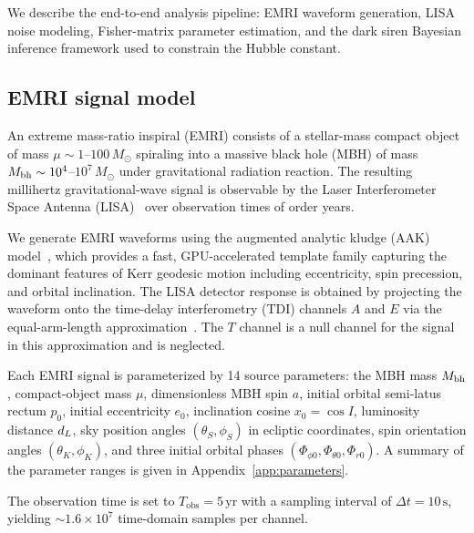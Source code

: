 
We describe the end-to-end analysis pipeline: EMRI waveform generation,
LISA noise modeling, Fisher-matrix parameter estimation, and the dark siren
Bayesian inference framework used to constrain the Hubble constant.

\subsection{EMRI signal model}
\label{sec:emri_signal}

An extreme mass-ratio inspiral (EMRI) consists of a stellar-mass compact
object of mass $\mu \sim 1$--$100\,M_\odot$ spiraling into a massive black
hole (MBH) of mass $M_\mathrm{bh} \sim 10^4$--$10^7\,M_\odot$ under gravitational
radiation reaction.  The resulting millihertz gravitational-wave signal is
observable by the Laser Interferometer Space Antenna
(LISA)~\cite{LISA:2024hlh,Babak:2017tow} over observation times of order
years.

We generate EMRI waveforms using the augmented analytic kludge (AAK)
model~\cite{Chua:2020stf,Katz:2021yft}, which provides a fast, GPU-accelerated
template family capturing the dominant features of Kerr geodesic motion
including eccentricity, spin precession, and orbital inclination.
The LISA detector response is obtained by projecting the waveform onto
the time-delay interferometry (TDI) channels $A$ and $E$ via the
equal-arm-length approximation~\cite{Katz:2022yqe}.  The $T$ channel
is a null channel for the signal in this approximation and is neglected.

Each EMRI signal is parameterized by 14 source parameters:
the MBH mass $M_\mathrm{bh}$, compact-object mass $\mu$, dimensionless MBH spin $a$,
initial orbital semi-latus rectum $p_0$, initial eccentricity $e_0$,
inclination cosine $x_0 = \cos I$, luminosity distance $d_L$,
sky position angles $(\theta_S, \phi_S)$ in ecliptic coordinates,
spin orientation angles $(\theta_K, \phi_K)$,
and three initial orbital phases $(\Phi_{\phi 0}, \Phi_{\theta 0}, \Phi_{r0})$.
A summary of the parameter ranges is given in Appendix~\ref{app:parameters}.

The observation time is set to $T_\mathrm{obs} = 5\,\mathrm{yr}$ with a
sampling interval of $\Delta t = 10\,\mathrm{s}$, yielding
$\sim 1.6 \times 10^7$ time-domain samples per channel.

